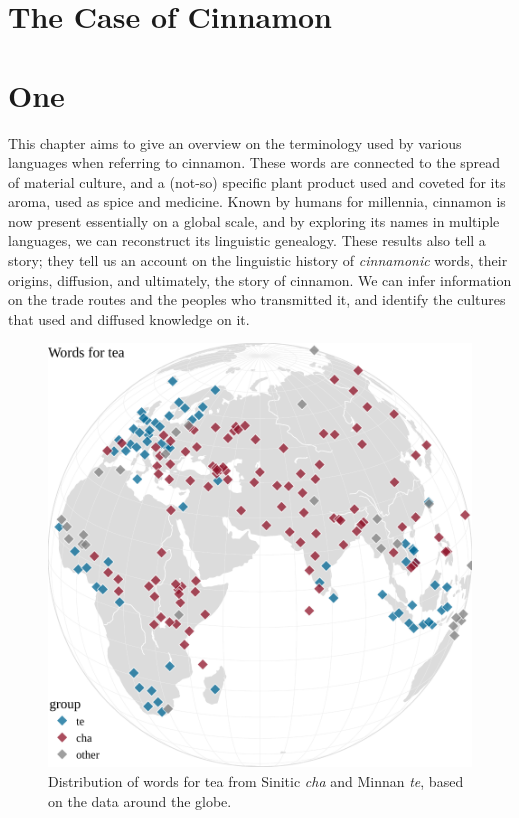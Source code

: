 



\section{The Case of Cinnamon}
\label{ch:cinnamon}

\section{One}


This chapter aims to give an overview on the terminology used by various languages when referring to cinnamon. These words are connected to the spread of material culture, and a (not-so) specific plant product used and coveted for its aroma, used as spice and medicine. Known by humans for millennia, cinnamon is now present essentially on a global scale, and by exploring its names in multiple languages, we can reconstruct its linguistic genealogy. These results also tell a story; they tell us an account on the linguistic history of \emph{cinnamonic} words, their origins, diffusion, and ultimately, the story of cinnamon. We can infer information on the trade routes and the peoples who transmitted it, and identify the cultures that used and diffused knowledge on it. 

\begin{figure}[ht!]
    \centering
    \includegraphics[width=\linewidth]{imgs/plots/distribution_tea.pdf}
    \caption{Distribution of words for tea from Sinitic \textit{cha} and Minnan \textit{te}, based on the data around the globe.}
    \label{fig:distribution_tea}
\end{figure}

